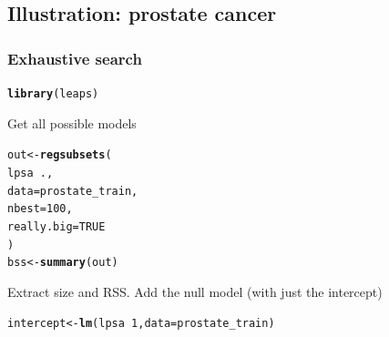 \documentclass[10pt, c, xcolor=x11names]{beamer}\usepackage[]{graphicx}\usepackage[]{color}
\makeatletter
\newcommand{\hlnum}[1]{\textcolor[rgb]{0.686,0.059,0.569}{#1}}%
\newcommand{\hlopt}[1]{\textcolor[rgb]{0,0,0}{#1}}%
\newcommand{\hlstd}[1]{\textcolor[rgb]{0.345,0.345,0.345}{#1}}%
\newcommand{\hlkwb}[1]{\textcolor[rgb]{0.69,0.353,0.396}{#1}}%
\newcommand{\hlkwc}[1]{\textcolor[rgb]{0.333,0.667,0.333}{#1}}%
\newcommand{\hlkwd}[1]{\textcolor[rgb]{0.737,0.353,0.396}{\textbf{#1}}}%
\newenvironment{kframe}{%
 \def\at@end@of@kframe{}%
 \ifinner\ifhmode%
  \def\at@end@of@kframe{\end{minipage}}%
  \begin{minipage}{\columnwidth}%
 \fi\fi%
 \def\FrameCommand##1{\hskip\@totalleftmargin \hskip-\fboxsep
 \colorbox{shadecolor}{##1}\hskip-\fboxsep
     \hskip-\linewidth \hskip-\@totalleftmargin \hskip\columnwidth}%
 \MakeFramed {\advance\hsize-\width
   \@totalleftmargin\z@ \linewidth\hsize
   \@setminipage}}%
 {\par\unskip\endMakeFramed%
 \at@end@of@kframe}
\newenvironment{knitrout}{}{} %
\makeatother
\begin{document}
\subsection{Illustration: prostate cancer}



\begin{frame}
  \frametitle{Exhaustive search}

\begin{knitrout}\scriptsize
{}\color{fgcolor}\begin{kframe}
\begin{alltt}
\hlkwd{library}\hlstd{(leaps)}
\end{alltt}
\end{kframe}
\end{knitrout}

Get all possible models
\begin{knitrout}\scriptsize
{}\color{fgcolor}\begin{kframe}
\begin{alltt}
\hlstd{out} \hlkwb{<-} \hlkwd{regsubsets}\hlstd{(}
          \hlstd{lpsa} \hlopt{~} \hlstd{. ,}
          \hlkwc{data}  \hlstd{= prostate_train,}
          \hlkwc{nbest} \hlstd{=} \hlnum{100}\hlstd{,}
          \hlkwc{really.big} \hlstd{=} \hlnum{TRUE}
        \hlstd{)}
\hlstd{bss} \hlkwb{<-} \hlkwd{summary}\hlstd{(out)}
\end{alltt}
\end{kframe}
\end{knitrout}

Extract size and RSS. Add the null model (with just the intercept)
\begin{knitrout}\scriptsize
{}\color{fgcolor}\begin{kframe}
\begin{alltt}
\hlstd{intercept} \hlkwb{<-} \hlkwd{lm}\hlstd{(lpsa} \hlopt{~} \hlnum{1}\hlstd{,} \hlkwc{data} \hlstd{= prostate_train)}
\end{alltt}
\end{kframe}
\end{knitrout}


\end{frame}
\end{document}
